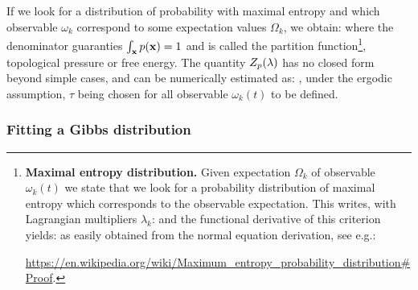 If we look for a distribution of probability with maximal entropy and which observable $\omega_{k}$ correspond to some expectation values ${\Omega}_{k}$, we obtain:
where the denominator guaranties $\int_{{\bf x}} p({\bf x}) = 1$ and is called the partition function\footnote{{\bf Maximal entropy distribution.} Given expectation  ${\Omega}_{k}$  of observable $\omega_{k}(t)$ we state that we look for a probability distribution of maximal entropy which corresponds to the observable expectation. This writes, with Lagrangian multipliers $\lambda_k$:
and the functional derivative of this criterion yields:
as easily obtained from the normal equation derivation, see e.g.:
\\ \centerline{\href{https://en.wikipedia.org/wiki/Maximum\_entropy\_probability\_distribution\#Proof}{https://en.wikipedia.org/wiki/Maximum\_entropy\_probability\_distribution\#Proof}.}\hr}, topological pressure or free energy. The quantity $Z_p({\bf \lambda})$ has no closed form beyond simple cases, and can be numerically estimated as:
, under the ergodic assumption, $\tau$ being chosen for all observable ${\omega}_{k}(t)$ to be defined.

\subsubsection*{Fitting a Gibbs distribution}

